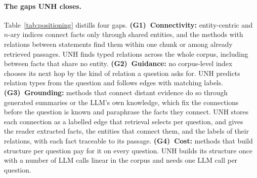 \documentclass[sigconf, review, anonymous]{acmart}
\newcommand{\sys}{UNH}
\begin{document}
\paragraph{The gaps \sys{} closes.}
Table~\ref{tab:positioning} distills four gaps. \textbf{(G1)~Connectivity:} entity-centric and $n$-ary indices connect facts only through shared entities, and the methods with relations between statements find them within one chunk or among already retrieved passages. \sys{} finds typed relations across the whole corpus, including between facts that share no entity. \textbf{(G2)~Guidance:} no corpus-level index chooses its next hop by the kind of relation a question asks for. \sys{} predicts relation types from the question and follows edges with matching labels. \textbf{(G3)~Grounding:} methods that connect distant evidence do so through generated summaries or the LLM's own knowledge, which fix the connections before the question is known and paraphrase the facts they connect. \sys{} stores each connection as a labelled edge that retrieval selects per question, and gives the reader extracted facts, the entities that connect them, and the labels of their relations, with each fact traceable to its passage. \textbf{(G4)~Cost:} methods that build structure per question pay for it on every question. \sys{} builds its structure once with a number of LLM calls linear in the corpus and needs one LLM call per question.
\end{document}
